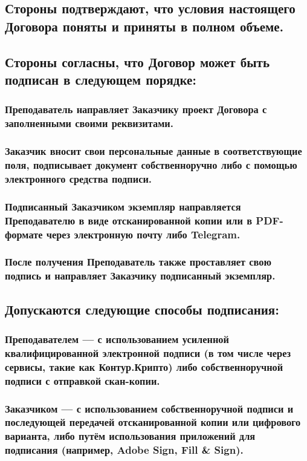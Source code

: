 \documentclass[a4paper,12pt]{article}
\begin{document}
    \subsection{Стороны подтверждают, что условия настоящего Договора поняты и приняты в полном объеме.}

    \subsection{Стороны согласны, что Договор может быть подписан в следующем порядке:}
        \subsubsection{Преподаватель направляет Заказчику проект Договора с заполненными своими реквизитами.}
        \subsubsection{Заказчик вносит свои персональные данные в соответствующие поля, подписывает документ собственноручно либо с помощью электронного средства подписи.}
        \subsubsection{Подписанный Заказчиком экземпляр направляется Преподавателю в виде отсканированной копии или в PDF-формате через электронную почту либо Telegram.}
        \subsubsection{После получения Преподаватель также проставляет свою подпись и направляет Заказчику подписанный экземпляр.}

    \subsection{Допускаются следующие способы подписания:}
        \subsubsection{Преподавателем — с использованием усиленной квалифицированной электронной подписи (в том числе через сервисы, такие как Контур.Крипто) либо собственноручной подписи с отправкой скан-копии.}
        \subsubsection{Заказчиком — с использованием собственноручной подписи и последующей передачей отсканированной копии или цифрового варианта, либо путём использования приложений для подписания (например, Adobe Sign, Fill \& Sign).}
\end{document}
